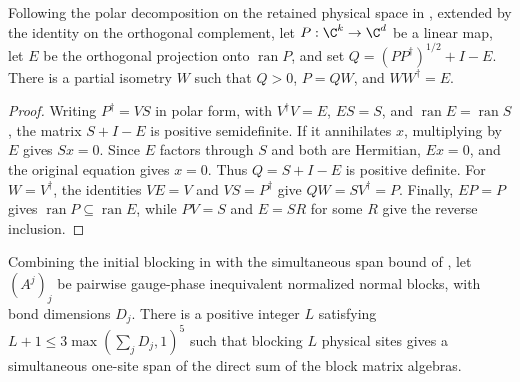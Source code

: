 \begin{lemma}
    \label{thm:parent_left_polar_support}
    \leanok
    Following the polar decomposition on the retained physical space in
    \cite[lines~579--584]{Schuch2011Phases}, extended by the identity on the
    orthogonal complement, let $P:\C^k\to\C^d$ be a linear map, let $E$ be
    the orthogonal projection onto $\operatorname{ran}P$, and set
    $Q=(PP^\dagger)^{1/2}+I-E$. There is a partial isometry $W$ such
    that $Q>0$, $P=QW$, and $WW^\dagger=E$.
\end{lemma}

\begin{proof}
    \leanok
    Writing $P^\dagger=VS$ in polar form, with $V^\dagger V=E$,
    $ES=S$, and $\operatorname{ran}E=\operatorname{ran}S$,
    the matrix $S+I-E$ is positive semidefinite. If it annihilates $x$,
    multiplying by $E$ gives $Sx=0$. Since $E$ factors through $S$
    and both are Hermitian, $Ex=0$, and the original equation gives
    $x=0$. Thus $Q=S+I-E$ is positive definite.
    For $W=V^\dagger$, the identities $VE=V$ and $VS=P^\dagger$
    give $QW=SV^\dagger=P$. Finally, $EP=P$ gives
    $\operatorname{ran}P\subseteq\operatorname{ran}E$, while
    $PV=S$ and $E=SR$ for some $R$ give the reverse inclusion.
\end{proof}

\begin{lemma}
    \label{thm:normal_block_injective_blocking}
    \leanok
    Combining the initial blocking in
    \cite[lines~575--597, Appendix~A]{Schuch2011Phases} with the simultaneous
    span bound of \cite[lines~317--345]{Cirac2016MPDO_arXiv}, let $(A^j)_j$ be
    pairwise gauge-phase inequivalent normalized normal blocks, with bond
    dimensions $D_j$. There is a positive integer $L$ satisfying
    $L+1\leq3\max(\sum_jD_j,1)^5$ such that blocking $L$ physical sites gives
    a simultaneous one-site span of the direct sum of the block matrix
    algebras.
\end{lemma}

